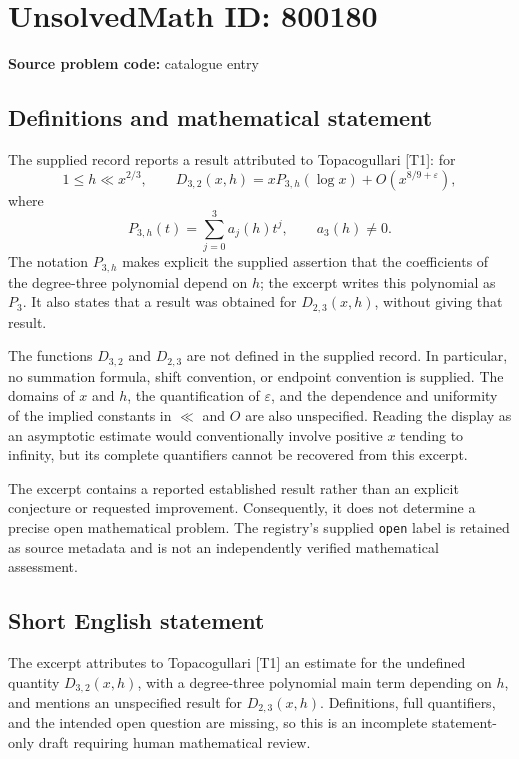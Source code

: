 \documentclass[11pt]{article}
\begin{document}
\section*{UnsolvedMath ID: 800180}
\textbf{Source problem code:} catalogue entry
\subsection{Definitions and mathematical statement}
The supplied record reports a result attributed to Topacogullari [T1]: for
\[
1\le h\ll x^{2/3},
\qquad
D_{3,2}(x,h)=xP_{3,h}(\log x)+O\!\left(x^{8/9+\varepsilon}\right),
\]
where
\[
P_{3,h}(t)=\sum_{j=0}^{3}a_j(h)t^j,
\qquad a_3(h)\ne0.
\]
The notation \(P_{3,h}\) makes explicit the supplied assertion that the coefficients of the degree-three polynomial depend on \(h\); the excerpt writes this polynomial as \(P_3\). It also states that a result was obtained for \(D_{2,3}(x,h)\), without giving that result.

The functions \(D_{3,2}\) and \(D_{2,3}\) are not defined in the supplied record. In particular, no summation formula, shift convention, or endpoint convention is supplied. The domains of \(x\) and \(h\), the quantification of \(\varepsilon\), and the dependence and uniformity of the implied constants in \(\ll\) and \(O\) are also unspecified. Reading the display as an asymptotic estimate would conventionally involve positive \(x\) tending to infinity, but its complete quantifiers cannot be recovered from this excerpt.

The excerpt contains a reported established result rather than an explicit conjecture or requested improvement. Consequently, it does not determine a precise open mathematical problem. The registry's supplied \texttt{open} label is retained as source metadata and is not an independently verified mathematical assessment.
\subsection{Short English statement}
The excerpt attributes to Topacogullari [T1] an estimate for the undefined quantity \(D_{3,2}(x,h)\), with a degree-three polynomial main term depending on \(h\), and mentions an unspecified result for \(D_{2,3}(x,h)\). Definitions, full quantifiers, and the intended open question are missing, so this is an incomplete statement-only draft requiring human mathematical review.
\end{document}
